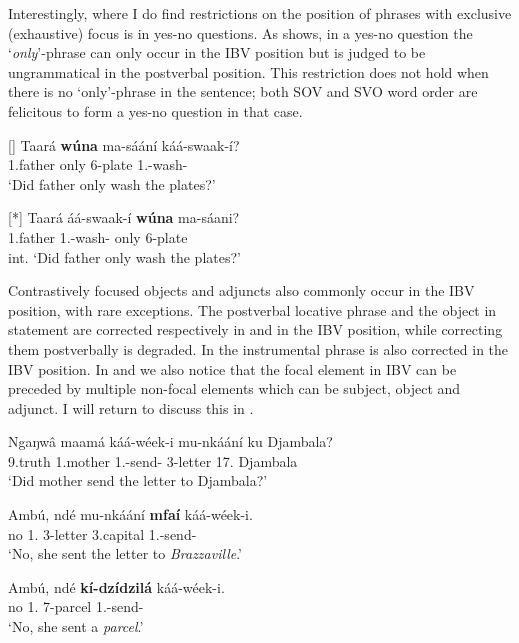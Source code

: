 \documentclass[output=paper,colorlinks,citecolor=brown,
]{langscibook}
\begin{document}
Interestingly, where I do find restrictions on the position of phrases with exclusive (exhaustive) focus is in yes-no questions. As  shows, in a yes-no question the `\textit{only}'-phrase can only occur in the IBV position but is judged to be ungrammatical in the postverbal position. This restriction does not hold when there is no `only'-phrase in the sentence; both SOV and SVO word order are felicitous to form a yes-no question in that case.
\begin{exe}
     \ex \label{29}
    \begin{xlist}
\ex
[]{
\label{29a}
\gll
Taará \textbf{wúna} ma-sáání káá-swaak-í?\\
1.father only 6-plate 1\Sm{}.\Pst{}-wash-\Pst{}\\
\trans ‘Did father only wash the plates?’
}

\ex
[*]{
\label{29b}
\gll
Taará áá-swaak-í \textbf{wúna} ma-sáani?\\
1.father 1\Sm{}.\Pst{}-wash-\Pst{} only 6-plate\\
\trans int. ‘Did father only wash the plates?’
}

    \end{xlist}
\end{exe}
Contrastively focused objects and adjuncts also commonly occur in the IBV position, with rare exceptions. The postverbal locative phrase and the object in statement  are corrected respectively in  and  in the IBV position, while correcting them postverbally is degraded. In  the instrumental phrase is also corrected in the IBV position. In  and  we also notice that the focal element in IBV can be preceded by multiple non-focal elements which can be subject, object and adjunct. I will return to discuss this in . 
\begin{exe}
    \ex \label{30}
    \begin{xlist}
\ex
\label{30a}
\gll
Ngaŋwâ maamá káá-wéek-i mu-nkáání ku Djambala?\\
9.truth 1.mother 1\Sm{}.\Pst{}-send-\Pst{} 3-letter 17.\Loc{} Djambala\\
\trans ‘Did mother send the letter to Djambala?’

\ex
\label{30b}
\gll
Ambú, ndé mu-nkáání \textbf{mfaí} káá-wéek-i.\\
no 1.\Pro{} 3-letter 3.capital 1\Sm{}.\Pst{}-send-\Pst{}\\
\trans ‘No, she sent the letter to \textit{Brazzaville}.’

\ex
\label{30c}
\gll
Ambú, ndé \textbf{kí-dzídzilá} káá-wéek-i.\\
no 1.\Pro{} 7-parcel 1\Sm{}.\Pst{}-send-\Pst{}\\
\trans ‘No, she sent a \textit{parcel}.’

    \end{xlist}
\end{exe}  
\end{document}
